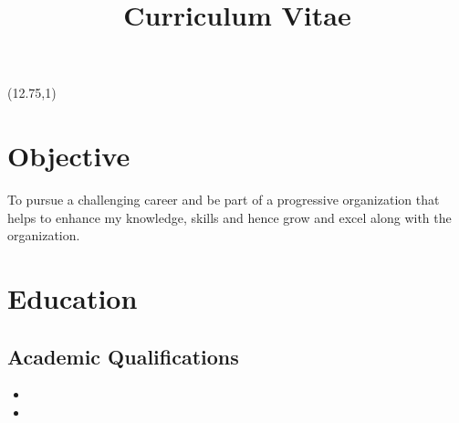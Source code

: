 \documentclass[10pt,a4paper,sans]{moderncv}
\title{Curriculum Vitae}
\begin{document}
	\hskip -3cm {\makecvtitle}
	\begin{textblock}{0}(12.75,1)
		\fboxsep=1mm
		\fboxrule=1pt
	\end{textblock}

	
	\section{Objective}	
		\vspace{5pt}
		\small{To pursue a challenging career and be part of a progressive organization that helps to enhance my knowledge, skills and hence grow and excel along with the organization.} 

	
	\section{Education}
		\vspace{5pt}
		\subsection{Academic Qualifications}
			
			\begin{itemize}

				\vspace{2pt}
				\item{}
				\vspace{2pt}
				\item{}

			\end{itemize}
		
\end{document}
